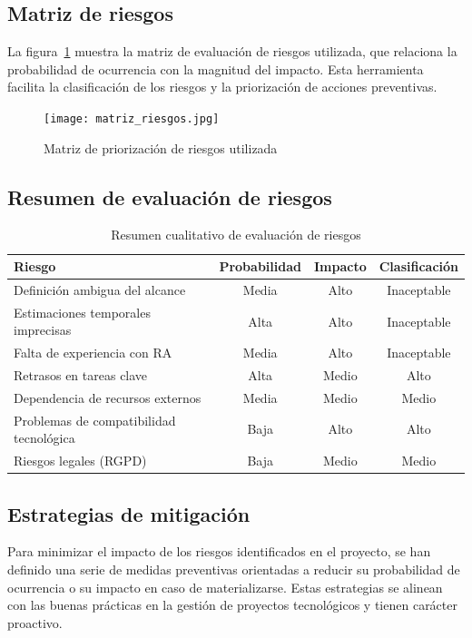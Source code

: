 \subsection{Matriz de riesgos}

La figura~\ref{fig:matriz-riesgos} muestra la matriz de evaluación de riesgos utilizada, que relaciona la probabilidad de ocurrencia con la magnitud del impacto. Esta herramienta facilita la clasificación de los riesgos y la priorización de acciones preventivas.

\begin{figure}[H]
\centering
\texttt{[image: matriz\_riesgos.jpg]}
\caption{Matriz de priorización de riesgos utilizada}
\label{fig:matriz-riesgos}
\end{figure}

\subsection{Resumen de evaluación de riesgos}

\begin{table}[H]
\centering
\caption{Resumen cualitativo de evaluación de riesgos}
\label{tabla:resumen-riesgos}
\begin{tabular}{|p{5.5cm}|c|c|c|}
\hline
\textbf{Riesgo} & \textbf{Probabilidad} & \textbf{Impacto} & \textbf{Clasificación} \\
\hline
Definición ambigua del alcance & Media & Alto & Inaceptable \\
Estimaciones temporales imprecisas & Alta & Alto & Inaceptable \\
Falta de experiencia con RA & Media & Alto & Inaceptable \\
Retrasos en tareas clave & Alta & Medio & Alto \\
Dependencia de recursos externos & Media & Medio & Medio \\
Problemas de compatibilidad tecnológica & Baja & Alto & Alto \\
Riesgos legales (RGPD) & Baja & Medio & Medio \\
\hline
\end{tabular}
\end{table}

\subsection{Estrategias de mitigación}

Para minimizar el impacto de los riesgos identificados en el proyecto, se han definido una serie de medidas preventivas orientadas a reducir su probabilidad de ocurrencia o su impacto en caso de materializarse. Estas estrategias se alinean con las buenas prácticas en la gestión de proyectos tecnológicos y tienen carácter proactivo.

